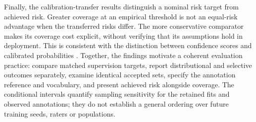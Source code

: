 Finally, the calibration-transfer results distinguish a nominal risk target from achieved risk. Greater coverage at an empirical threshold is not an equal-risk advantage when the transferred risks differ. The more conservative comparator makes its coverage cost explicit, without verifying that its assumptions hold in deployment. This is consistent with the distinction between confidence scores and calibrated probabilities \cite{guo2017calibration}. Together, the findings motivate a coherent evaluation practice: compare matched supervision targets, report distributional and selective outcomes separately, examine identical accepted sets, specify the annotation reference and vocabulary, and present achieved risk alongside coverage. The conditional intervals quantify sampling sensitivity for the retained fits and observed annotations; they do not establish a general ordering over future training seeds, raters or populations.
